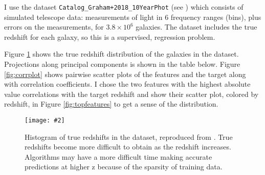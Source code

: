 \documentclass[13pt]{amsart}
\newcommand{\figscale}[4]{
\begin{figure}[h]
    \centering
    \caption{#3}
    \label{#4}
    \texttt{[image: \#2]}
\end{figure}
}
\begin{document}
    I use the dataset \texttt{Catalog\_Graham+2018\_10YearPhot} (see \cite{graham}) which consists of simulated telescope data: measurements of light in 6 frequency ranges (bins), plus errors on the measurements, for $3.8 \times 10^6$ galaxies. The dataset includes the true redshift for each galaxy, so this is a supervised, regression problem.

    Figure \ref{fig:zdist} shows the true redshift distribution of the galaxies in the dataset. Projections along principal components is shown in the table below. Figure \ref{fig:corrplot} shows pairwise scatter plots of the features and the target along with correlation coefficients. I chose the two features with the highest absolute value correlations with the target redshift and show their scatter plot, colored by redshift, in Figure \ref{fig:topfeatures} to get a sense of the distribution.

    \figscale{0.6}{../plots/figure_true_redshift_histogram.png}{Histogram of true redshifts in the dataset, reproduced from \cite{graham}. True redshifts become more difficult to obtain as the redshift increases. Algorithms may have a more difficult time making accurate predictions at higher z because of the sparsity of training data.}{fig:zdist}

\end{document}
